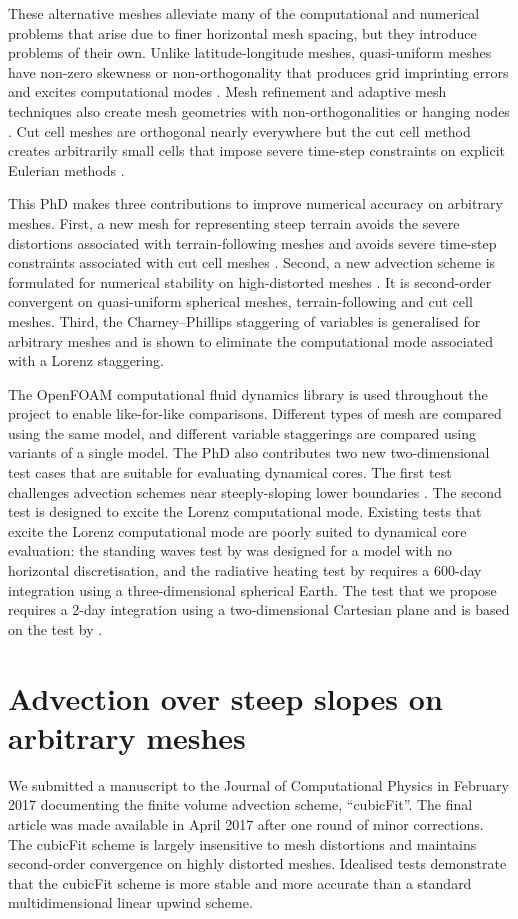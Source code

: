 \documentclass[a4paper,11pt]{article}
\begin{document}
These alternative meshes alleviate many of the computational and numerical problems that arise due to finer horizontal mesh spacing, but they introduce problems of their own.
Unlike latitude-longitude meshes, quasi-uniform meshes have non-zero skewness or non-orthogonality that produces grid imprinting errors and excites computational modes \citep{weller2012}.
Mesh refinement and adaptive mesh techniques also create mesh geometries with non-orthogonalities or hanging nodes \citep{marras2016}.
Cut cell meshes are orthogonal nearly everywhere but the cut cell method creates arbitrarily small cells that impose severe time-step constraints on explicit Eulerian methods \citep{klein2009}.

This PhD makes three contributions to improve numerical accuracy on arbitrary meshes.  First, a new mesh for representing steep terrain avoids the severe distortions associated with terrain-following meshes \citep{shaw-weller2016} and avoids severe time-step constraints associated with cut cell meshes \citep{shaw2017}.  Second, a new advection scheme is formulated for numerical stability on high-distorted meshes \citep{shaw2017}.  It is second-order convergent on quasi-uniform spherical meshes, terrain-following and cut cell meshes.
Third, the Charney--Phillips staggering of variables is generalised for arbitrary meshes and is shown to eliminate the computational mode associated with a Lorenz staggering.

The OpenFOAM computational fluid dynamics library is used throughout the project to enable like-for-like comparisons.  Different types of mesh are compared using the same model, and different variable staggerings are compared using variants of a single model.
The PhD also contributes two new two-dimensional test cases that are suitable for evaluating dynamical cores.  The first test challenges advection schemes near steeply-sloping lower boundaries \citep{shaw2017}.
The second test is designed to excite the Lorenz computational mode.  Existing tests that excite the Lorenz computational mode are poorly suited to dynamical core evaluation: the standing waves test by \citet{arakawa-konor1996} was designed for a model with no horizontal discretisation, and the radiative heating test by \cite{untch-hortal2004} requires a 600-day integration using a three-dimensional spherical Earth.  The test that we propose requires a 2-day integration using a two-dimensional Cartesian plane and is based on the test by \citet{arakawa-konor1996}.


\section{Advection over steep slopes on arbitrary meshes}
We submitted a manuscript to the Journal of Computational Physics in February 2017 documenting the finite volume advection scheme, ``cubicFit''.  The final article \citep{shaw2017} was made available in April 2017 after one round of minor corrections.  The cubicFit scheme is largely insensitive to mesh distortions and maintains second-order convergence on highly distorted meshes.  Idealised tests demonstrate that the cubicFit scheme is more stable and more accurate than a standard multidimensional linear upwind scheme.
\end{document}
